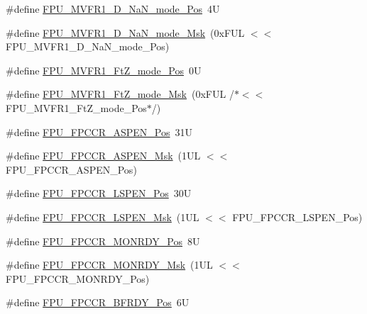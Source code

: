 \begin{DoxyCompactItemize}
\#define \mbox{\hyperlink{group___c_m_s_i_s___f_p_u_gae34d7ce42e50e2f1ea3e654fd3ba690a}{F\+P\+U\+\_\+\+M\+V\+F\+R1\+\_\+\+D\+\_\+\+Na\+N\+\_\+mode\+\_\+\+Pos}}~4U
\item 
\#define \mbox{\hyperlink{group___c_m_s_i_s___f_p_u_gad6af7c4632dba5a417307d456fe9b8a7}{F\+P\+U\+\_\+\+M\+V\+F\+R1\+\_\+\+D\+\_\+\+Na\+N\+\_\+mode\+\_\+\+Msk}}~(0x\+F\+U\+L $<$$<$ F\+P\+U\+\_\+\+M\+V\+F\+R1\+\_\+\+D\+\_\+\+Na\+N\+\_\+mode\+\_\+\+Pos)
\item 
\#define \mbox{\hyperlink{group___c_m_s_i_s___f_p_u_ga7faa5bfa85036f8511793234cbbc2409}{F\+P\+U\+\_\+\+M\+V\+F\+R1\+\_\+\+Ft\+Z\+\_\+mode\+\_\+\+Pos}}~0U
\item 
\#define \mbox{\hyperlink{group___c_m_s_i_s___f_p_u_gac566bde39a7afcceffbb21d830c269c1}{F\+P\+U\+\_\+\+M\+V\+F\+R1\+\_\+\+Ft\+Z\+\_\+mode\+\_\+\+Msk}}~(0x\+F\+U\+L /$\ast$$<$$<$ F\+P\+U\+\_\+\+M\+V\+F\+R1\+\_\+\+Ft\+Z\+\_\+mode\+\_\+\+Pos$\ast$/)
\item 
\#define \mbox{\hyperlink{group___c_m_s_i_s___f_p_u_ga4228a923ddf665f868e56b4b9e9bff7b}{F\+P\+U\+\_\+\+F\+P\+C\+C\+R\+\_\+\+A\+S\+P\+E\+N\+\_\+\+Pos}}~31U
\item 
\#define \mbox{\hyperlink{group___c_m_s_i_s___f_p_u_ga309886ff6bbd25cb13c061c6683c6c0c}{F\+P\+U\+\_\+\+F\+P\+C\+C\+R\+\_\+\+A\+S\+P\+E\+N\+\_\+\+Msk}}~(1\+U\+L $<$$<$ F\+P\+U\+\_\+\+F\+P\+C\+C\+R\+\_\+\+A\+S\+P\+E\+N\+\_\+\+Pos)
\item 
\#define \mbox{\hyperlink{group___c_m_s_i_s___f_p_u_gac7d70e051fe759ad8fed83bf5b5aebc1}{F\+P\+U\+\_\+\+F\+P\+C\+C\+R\+\_\+\+L\+S\+P\+E\+N\+\_\+\+Pos}}~30U
\item 
\#define \mbox{\hyperlink{group___c_m_s_i_s___f_p_u_gaf4ab19de45df6522dd882bc116f938e9}{F\+P\+U\+\_\+\+F\+P\+C\+C\+R\+\_\+\+L\+S\+P\+E\+N\+\_\+\+Msk}}~(1\+U\+L $<$$<$ F\+P\+U\+\_\+\+F\+P\+C\+C\+R\+\_\+\+L\+S\+P\+E\+N\+\_\+\+Pos)
\item 
\#define \mbox{\hyperlink{group___c_m_s_i_s___f_p_u_gae0a4effc79209d821ded517c2be326ba}{F\+P\+U\+\_\+\+F\+P\+C\+C\+R\+\_\+\+M\+O\+N\+R\+D\+Y\+\_\+\+Pos}}~8U
\item 
\#define \mbox{\hyperlink{group___c_m_s_i_s___f_p_u_ga42067729a887081cf56b8fe1029be7a1}{F\+P\+U\+\_\+\+F\+P\+C\+C\+R\+\_\+\+M\+O\+N\+R\+D\+Y\+\_\+\+Msk}}~(1\+U\+L $<$$<$ F\+P\+U\+\_\+\+F\+P\+C\+C\+R\+\_\+\+M\+O\+N\+R\+D\+Y\+\_\+\+Pos)
\item 
\#define \mbox{\hyperlink{group___c_m_s_i_s___f_p_u_ga6d633920f92c3ce4133d769701619b17}{F\+P\+U\+\_\+\+F\+P\+C\+C\+R\+\_\+\+B\+F\+R\+D\+Y\+\_\+\+Pos}}~6U
\item 

\end{DoxyCompactItemize}
